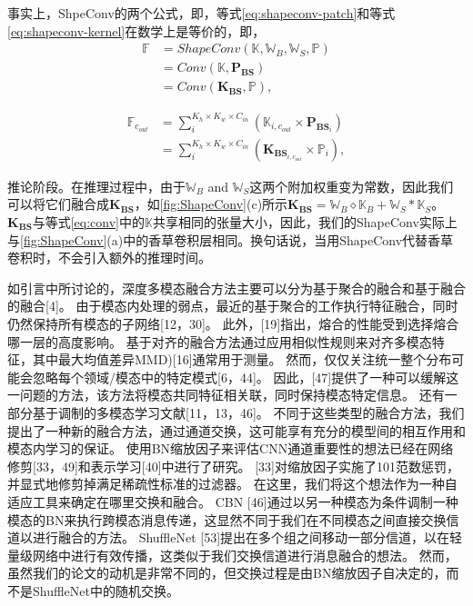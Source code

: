 事实上，ShpeConv的两个公式，即，等式\ref{eq:shapeconv-patch}和等式\ref{eq:shapeconv-kernel}在数学上是等价的，即，
\begin{equation}
	\begin{aligned}
		\mathbb{F} &= ShapeConv(\mathbb{K}, \mathbb{W}_B, \mathbb{W}_S, \mathbb{P})\\
		&= Conv(\mathbb{K}, \textbf{P}_\textbf{BS})\\
		&= Conv(\textbf{K}_\textbf{BS}, \mathbb{P}),
	\end{aligned}
\end{equation}

\begin{equation}
	\begin{aligned}
		\mathbb{F}_{c_{out}} &= \sum_{i}^{K_h \times K_w \times C_{in}} (\mathbb{K}_{i,{c_{out}}} \times \textbf{P}_{\textbf{BS}_{i}})\\
		&= \sum_{i}^{K_h \times K_w \times C_{in}} (\textbf{K}_{\textbf{BS}_{i,{c_{out}}}} \times \mathbb{P}_{i}),
	\end{aligned}
\end{equation}


推论阶段。在推理过程中，由于$\mathbb{W}_B$ and $\mathbb{W}_S$这两个附加权重变为常数，因此我们可以将它们融合成$\textbf{K}_\textbf{BS}$，如\ref{fig:ShapeConv}(c)所示$\textbf{K}_\textbf{BS} = \mathbb{W}_B \diamond \mathbb{K}_B+ \mathbb{W}_S \ast \mathbb{K}_S$。
$\textbf{K}_\textbf{BS}$与等式\ref{eq:conv}中的$\mathbb{K}$共享相同的张量大小，因此，我们的ShapeConv实际上与\ref{fig:ShapeConv}(a)中的香草卷积层相同。换句话说，当用ShapeConv代替香草卷积时，不会引入额外的推理时间。


如引言中所讨论的，深度多模态融合方法主要可以分为基于聚合的融合和基于融合的融合[4]。
由于模态内处理的弱点，最近的基于聚合的工作执行特征融合，同时仍然保持所有模态的子网络[12，30]。
此外，[19]指出，熔合的性能受到选择熔合哪一层的高度影响。
基于对齐的融合方法通过应用相似性规则来对齐多模态特征，其中最大均值差异MMD)[16]通常用于测量。
然而，仅仅关注统一整个分布可能会忽略每个领域/模态中的特定模式[6，44]。
因此，[47]提供了一种可以缓解这一问题的方法，该方法将模态共同特征相关联，同时保持模态特定信息。
还有一部分基于调制的多模态学习文献[11，13，46]。
不同于这些类型的融合方法，我们提出了一种新的融合方法，通过通道交换，这可能享有充分的模型间的相互作用和模态内学习的保证。
使用BN缩放因子来评估CNN通道重要性的想法已经在网络修剪[33，49]和表示学习[40]中进行了研究。
[33]对缩放因子实施了101范数惩罚，并显式地修剪掉满足稀疏性标准的过滤器。
在这里，我们将这个想法作为一种自适应工具来确定在哪里交换和融合。
CBN [46]通过以另一种模态为条件调制一种模态的BN来执行跨模态消息传递，这显然不同于我们在不同模态之间直接交换信道以进行融合的方法。
ShuffleNet [53]提出在多个组之间移动一部分信道，以在轻量级网络中进行有效传播，这类似于我们交换信道进行消息融合的想法。
然而，虽然我们的论文的动机是非常不同的，但交换过程是由BN缩放因子自决定的，而不是ShuffleNet中的随机交换。









